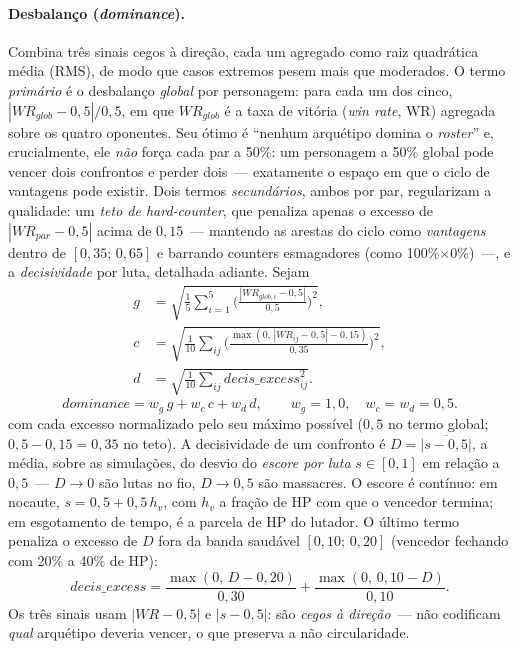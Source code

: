 \documentclass[12pt]{article}
\begin{document}
\paragraph{Desbalanço (\emph{dominance}).} Combina três sinais cegos à direção,
cada um agregado como raiz quadrática média (RMS), de modo que casos extremos pesem
mais que moderados. O termo \emph{primário} é o desbalanço \emph{global} por
personagem: para cada um dos cinco, $|\textit{WR}_{\textit{glob}}-0{,}5|/0{,}5$, em
que $\textit{WR}_{\textit{glob}}$ é a taxa de vitória (\emph{win rate}, WR) agregada
sobre os quatro oponentes. Seu ótimo é ``nenhum arquétipo domina o \emph{roster}''
e, crucialmente, ele \emph{não} força cada par a 50\%: um personagem a 50\% global
pode vencer dois confrontos e perder dois~--- exatamente o espaço em que o ciclo de
vantagens pode existir. Dois termos \emph{secundários}, ambos por par, regularizam
a qualidade: um \emph{teto de hard-counter}, que penaliza apenas o excesso de
$|\textit{WR}_{\textit{par}}-0{,}5|$ acima de $0{,}15$~--- mantendo as arestas do
ciclo como \emph{vantagens} dentro de $[0{,}35;\,0{,}65]$ e barrando counters
esmagadores (como 100\%$\times$0\%)~---, e a \emph{decisividade} por luta,
detalhada adiante. Sejam
\begin{equation}
\begin{aligned}
g &= \sqrt{\tfrac{1}{5}\textstyle\sum_{i=1}^{5}\Big(\tfrac{|\textit{WR}_{\textit{glob},i}-0{,}5|}{0{,}5}\Big)^{2}}, \\[2pt]
c &= \sqrt{\tfrac{1}{10}\textstyle\sum_{ij}\Big(\tfrac{\max(0,\,|\textit{WR}_{ij}-0{,}5|-0{,}15)}{0{,}35}\Big)^{2}}, \\[2pt]
d &= \sqrt{\tfrac{1}{10}\textstyle\sum_{ij}\textit{decis\_excess}_{ij}^{2}} .
\end{aligned}
\end{equation}
\begin{equation}
\textit{dominance} = w_{g}\,g + w_{c}\,c + w_{d}\,d,\qquad
w_{g}=1{,}0,\quad w_{c}=w_{d}=0{,}5 .
\end{equation}
com cada excesso normalizado pelo seu máximo possível ($0{,}5$ no termo global;
$0{,}5-0{,}15=0{,}35$ no teto). A decisividade de um confronto é
$D=\overline{|s-0{,}5|}$, a média, sobre as simulações, do desvio do \emph{escore
por luta} $s\in[0,1]$ em relação a $0{,}5$~--- $D\!\to\!0$ são lutas no fio,
$D\!\to\!0{,}5$ são massacres. O escore é contínuo: em nocaute,
$s=0{,}5+0{,}5\,h_{v}$, com $h_{v}$ a fração de HP com que o vencedor termina; em
esgotamento de tempo, é a parcela de HP do lutador. O último termo penaliza o
excesso de $D$ fora da banda saudável $[0{,}10;\,0{,}20]$ (vencedor fechando com
20\% a 40\% de HP):
\begin{equation}
\textit{decis\_excess} = \frac{\max(0,\,D-0{,}20)}{0{,}30}
+ \frac{\max(0,\,0{,}10-D)}{0{,}10} .
\end{equation}
Os três sinais usam $|\textit{WR}-0{,}5|$ e $|s-0{,}5|$: são \emph{cegos à
direção}~--- não codificam \emph{qual} arquétipo deveria vencer, o que preserva a
não circularidade.
\end{document}
